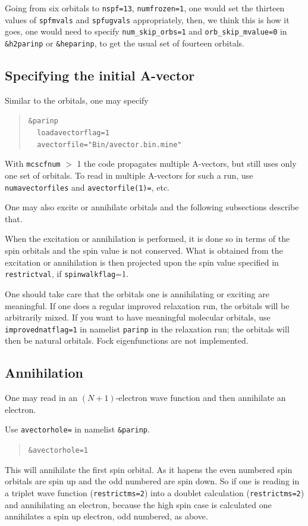 \documentclass[10pt,leqno, oneside]{book}
\begin{document}
Going from six orbitals to \verb#nspf=13#, \verb#numfrozen=1#, one would
set the thirteen values of \verb#spfmvals# and \verb#spfugvals# appropriately, then, we think this is how it goes,
one would need to specify \verb#num_skip_orbs=1# and \verb#orb_skip_mvalue=0# in \verb#&h2parinp#
or \verb#&heparinp#, to get the usual set of fourteen orbitals. 

\subsection{Specifying the initial A-vector}

Similar to the orbitals, one may specify
\begin{quote}
{\footnotesize 
\verb#&parinp# \\
\verb#  loadavectorflag=1#\\
\verb#  avectorfile="Bin/avector.bin.mine"#}
\end{quote}

With \verb#mcscfnum# $>$ 1 the code propagates multiple A-vectors, but still uses only one set of orbitals.  
To read in multiple A-vectors for such a 
run, use \verb#numavectorfiles# and \verb#avectorfile(1)=#, etc.  

One may also excite or annihilate orbitals and the following subsections describe that.  

When the excitation or annihilation is performed, it is done so in terms of the spin orbitals and the spin value is not conserved.  What is obtained from the excitation or annihilation is then projected upon the spin value specified in \verb#restrictval#, if \verb#spinwalkflag#=1.

One should take care that the orbitals one is annihilating or exciting are meaningful.  If one does a regular improved relaxation run, the orbitals will
be arbitrarily mixed.  If you want to have meaningful molecular orbitals, use \verb#improvednatflag=1#
in namelist \verb#parinp# in the relaxation run; the orbitals will then be natural orbitals.  Fock eigenfunctions are not implemented. 




\subsection{Annihilation}

One may read in an $(N+1)$-electron wave function and then annihilate an electron.  

Use \verb#avectorhole=# in namelist \verb#&parinp#.
\begin{quote}
{\footnotesize 
\verb#&avectorhole=1# }
\end{quote}
This will annihilate the first spin orbital.  As it hapens the even numbered spin orbitals are spin up and the odd numbered are spin down.  So if one is
reading in a triplet wave function (\verb#restrictms=2#) into a doublet calculation (\verb#restrictms=2#) and annihilating an electron, because the
high spin case is calculated one annihilates a spin up electron, odd numbered, as above.
\end{document}
